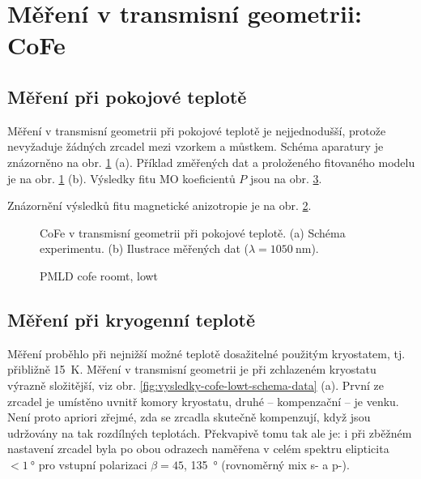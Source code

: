 \section{Měření v transmisní geometrii: CoFe}
\label{chap:vysledky-cofe}

\subsection{Měření při pokojové teplotě}
\label{chap:vysledky-cofe-roomt}

Měření v transmisní geometrii při pokojové teplotě je nejjednodušší, protože nevyžaduje žádných zrcadel mezi vzorkem a můstkem.
Schéma aparatury je znázorněno na obr. \ref{fig:vysledky-cofe-schema-data} (a).
Příklad změřených dat a proloženého fitovaného modelu je na obr. \ref{fig:vysledky-cofe-schema-data} (b).
Výsledky fitu MO koeficientů $P$ jsou na obr. \ref{fig:vysledky-cofe-PMLD}.

Znázornění výsledků fitu magnetické anizotropie je na obr. \ref{fig:vysledky-cofe-roomt-anizotropie}.

\begin{figure}[htbp]
    \centering
    \missingfigure{}
    \caption{CoFe v transmisní geometrii při pokojové teplotě. (a) Schéma experimentu. (b) Ilustrace měřených dat ($\lambda=\SI{1050}{\nano\meter}$).}
    \label{fig:vysledky-cofe-schema-data}
\end{figure}

\begin{figure}[htbp]
    \centering
    \missingfigure{}
    \caption{}
    \label{fig:vysledky-cofe-roomt-anizotropie}
\end{figure}

\begin{figure}[htbp]
    \centering
    \missingfigure{}
    \caption{PMLD cofe roomt, lowt}
    \label{fig:vysledky-cofe-PMLD}
\end{figure}

\subsection{Měření při kryogenní teplotě}
\label{chap:vysledky-cofe-lowt}

Měření proběhlo při nejnižší možné teplotě dosažitelné použitým kryostatem, tj. přibližně \SI{15}{\kelvin}.
Měření v transmisní geometrii je při zchlazeném kryostatu výrazně složitější, viz obr. \ref{fig:vysledky-cofe-lowt-schema-data} (a).
První ze zrcadel je umístěno uvnitř komory kryostatu, druhé -- kompenzační -- je venku.
Není proto apriori zřejmé, zda se zrcadla skutečně kompenzují, když jsou udržovány na tak rozdílných teplotách.
Překvapivě tomu tak ale je: i při zběžném nastavení zrcadel byla po obou odrazech naměřena v celém spektru elipticita $<\SI{1}{\degree}$ pro vstupní polarizaci $\beta=45$, \SI{135}{\degree} (rovnoměrný mix s- a p-).

